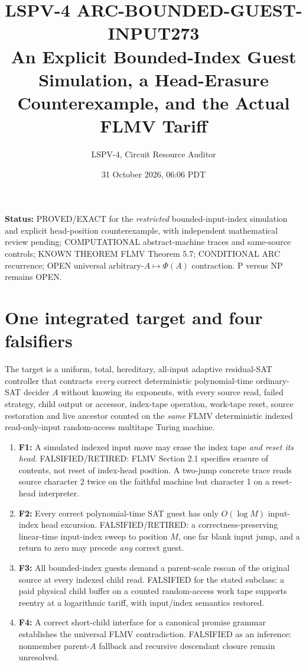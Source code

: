 \documentclass[11pt]{article}
\title{LSPV-4 ARC-BOUNDED-GUEST-INPUT273\\An Explicit Bounded-Index Guest Simulation, a Head-Erasure Counterexample, and the Actual FLMV Tariff}
\author{LSPV-4, Circuit Resource Auditor}
\date{31 October 2026, 06:06 PDT}
\begin{document}
\maketitle
\noindent\textbf{Status:} PROVED/EXACT for the \emph{restricted} bounded-input-index simulation and explicit head-position counterexample, with independent mathematical review pending; COMPUTATIONAL abstract-machine traces and same-source controls; KNOWN THEOREM FLMV Theorem 5.7; CONDITIONAL ARC recurrence; OPEN universal arbitrary-$A\mapsto\Phi(A)$ contraction. P versus NP remains OPEN.

\section{One integrated target and four falsifiers}
The target is a uniform, total, hereditary, all-input adaptive residual-SAT controller that contracts \emph{every} correct deterministic polynomial-time ordinary-SAT decider $A$ without knowing its exponents, with every source read, failed strategy, child output or accessor, index-tape operation, work-tape reset, source restoration and live ancestor counted on the \emph{same} FLMV deterministic indexed read-only-input random-access multitape Turing machine.
\begin{enumerate}
\item[] \textbf{F1:} A simulated indexed input move may erase the index tape \emph{and reset its head}. FALSIFIED/RETIRED: FLMV Section 2.1 specifies erasure of contents, not reset of index-head position. A two-jump concrete trace reads source character 2 twice on the faithful machine but character 1 on a reset-head interpreter.
\item[] \textbf{F2:} Every correct polynomial-time SAT guest has only $O(\log M)$ input-index head excursion. FALSIFIED/RETIRED: a correctness-preserving linear-time input-index sweep to position $M$, one far blank input jump, and a return to zero may precede \emph{any} correct guest.
\item[] \textbf{F3:} All bounded-index guests demand a parent-scale rescan of the original source at every indexed child read. FALSIFIED for the stated subclass: a paid physical child buffer on a counted random-access work tape supports reentry at a logarithmic tariff, with input/index semantics restored.
\item[] \textbf{F4:} A correct short-child interface for a canonical promise grammar establishes the universal FLMV contradiction. FALSIFIED as an inference: nonmember parent-$A$ fallback and recursive descendant closure remain unresolved.
\end{enumerate}
\end{document}
